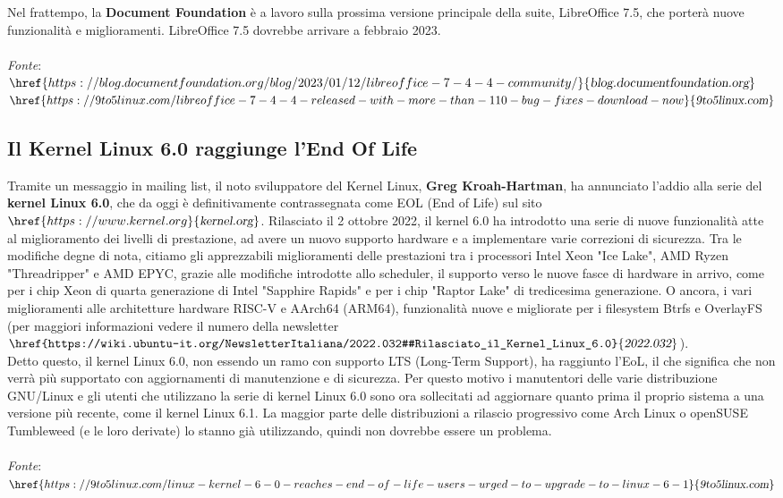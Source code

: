 \documentclass[a4paper,twoside]{article}
\begin{document}
Nel frattempo, la \textbf{Document Foundation} è a lavoro sulla prossima versione principale della suite, LibreOffice 7.5, che porterà nuove funzionalità e miglioramenti. LibreOffice 7.5 dovrebbe arrivare a febbraio 2023.\\
\\
\textit{Fonte}:\\
$\href{https://blog.documentfoundation.org/blog/2023/01/12/libreoffice-7-4-4-community/}{\textsl{blog.documentfoundation.org}}$\\
$\href{https://9to5linux.com/libreoffice-7-4-4-released-with-more-than-110-bug-fixes-download-now}{\textsl{9to5linux.com}}$

\subsection{Il Kernel Linux 6.0 raggiunge l'End Of Life}
Tramite un messaggio in mailing list, il noto sviluppatore del Kernel Linux, \textbf{Greg Kroah-Hartman}, ha annunciato l'addio alla serie del \textbf{kernel Linux 6.0}, che da oggi è definitivamente contrassegnata come EOL (End of Life) sul sito $\href{https://www.kernel.org}{\textsl{kernel.org}}$. Rilasciato il 2 ottobre 2022, il kernel 6.0 ha introdotto una serie di nuove funzionalità atte al miglioramento dei livelli di prestazione, ad avere un nuovo supporto hardware e a implementare varie correzioni di sicurezza. Tra le modifiche degne di nota, citiamo gli apprezzabili miglioramenti delle prestazioni tra i processori Intel Xeon "Ice Lake", AMD Ryzen "Threadripper" e AMD EPYC, grazie alle modifiche introdotte allo scheduler, il supporto verso le nuove fasce di hardware in arrivo, come per i chip Xeon di quarta generazione di Intel "Sapphire Rapids" e per i chip "Raptor Lake" di tredicesima generazione. O ancora, i vari miglioramenti alle architetture hardware RISC-V e AArch64 (ARM64), funzionalità nuove e migliorate per i filesystem Btrfs e OverlayFS (per maggiori informazioni vedere il numero della newsletter $\href{https://wiki.ubuntu-it.org/NewsletterItaliana/2022.032#Rilasciato_il_Kernel_Linux_6.0}{\textsl{2022.032}}$).\\
Detto questo, il kernel Linux 6.0, non essendo un ramo con supporto LTS (Long-Term Support), ha raggiunto l'EoL, il che significa che non verrà più supportato con aggiornamenti di manutenzione e di sicurezza. Per questo motivo i manutentori delle varie distribuzione GNU/Linux e gli utenti che utilizzano la serie di kernel Linux 6.0 sono ora sollecitati ad aggiornare quanto prima il proprio sistema a una versione più recente, come il kernel Linux 6.1. La maggior parte delle distribuzioni a rilascio progressivo come Arch Linux o openSUSE Tumbleweed (e le loro derivate) lo stanno già utilizzando, quindi non dovrebbe essere un problema.\\
\\
\textit{Fonte}:\\
$\href{https://9to5linux.com/linux-kernel-6-0-reaches-end-of-life-users-urged-to-upgrade-to-linux-6-1}{\textsl{9to5linux.com}}$
\end{document}
